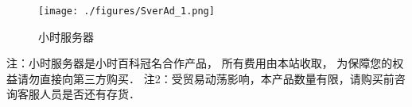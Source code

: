 
\begin{issues}
\issueDraft
\end{issues}

\begin{figure}[ht]
\centering
\texttt{[image: ./figures/SverAd\_1.png]}
\caption{小时服务器}\label{SverAd_fig1}
\end{figure}

注：小时服务器是小时百科冠名合作产品， 所有费用由本站收取， 为保障您的权益请勿直接向第三方购买．
注2：受贸易动荡影响，本产品数量有限，请购买前咨询客服人员是否还有存货．
